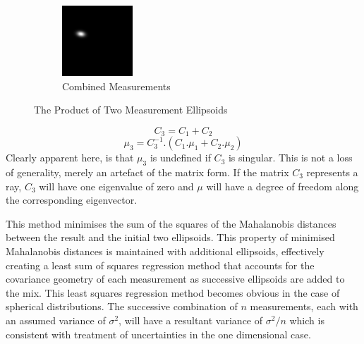\documentclass{article}
\begin{document}
\begin{figure}
\begin{subfigure}{.3\textwidth}
        \end{subfigure}
        \begin{subfigure}{.3\textwidth}
          \centering
          \includegraphics[width=.8\linewidth]{images/GaussianLine3.png}
          \caption{Combined Measurements}
          \label{fig:uncProdsub3}
        \end{subfigure}
        \caption{The Product of Two Measurement Ellipsoids}
        \label{fig:uncProd}
        \end{figure}

        \begin{equation}
        C_3 = C_1+C_2
        \end{equation}
        \begin{equation}
        \mu_3 = C_3^{-1} . (C_1.\mu_1 + C_2.\mu_2)
        \end{equation}
        Clearly apparent here, is that \(\mu_3\) is undefined if \(C_3\) is singular.
        This is not a loss of generality, merely an artefact of the matrix form.  If the matrix \(C_3\) represents a ray, \(C_3\) will have one eigenvalue of zero and \(\mu\) will have a degree of freedom along the corresponding eigenvector.
        
        This method minimises the sum of the squares of the Mahalanobis distances between the result and the initial two ellipsoids.  This property of minimised Mahalanobis distances is maintained with additional ellipsoids, effectively creating a least sum of squares regression method that accounts for the covariance geometry of each measurement as successive ellipsoids are added to the mix.
        This least squares regression method becomes obvious in the case of spherical distributions.  The successive combination of \(n\) measurements, each with an assumed variance of \(\sigma^2\), will have a resultant variance of \(\sigma^2/n\) which is consistent with treatment of uncertainties in the one dimensional case.
\end{document}

